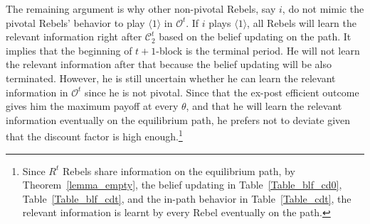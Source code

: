 \documentclass[12pt,letter]{article}
\newcommand{\Kappa}{\mathcal{C}}
\newcommand{\Omicron}{\mathcal{O}}
\theoremstyle{definition}
\theoremstyle{remark}
\theoremstyle{claim}
\begin{document}
The remaining argument is why other non-pivotal Rebels, say $i$, do not mimic the pivotal Rebels' behavior to play $\langle 1 \rangle$ in $\Omicron^t$. If $i$ plays $\langle 1 \rangle$, all Rebels will learn the relevant information right after $\Kappa^t_2$ based on the belief updating on the path. It implies that the beginning of $t+1$-block is the terminal period. He will not learn the relevant information after that because the belief updating will be also terminated. However, he is still uncertain whether he can learn the relevant information in $\Omicron^t$ since he is not pivotal. Since that the ex-post efficient outcome gives him the maximum payoff at every $\theta$, and that he will learn the relevant information eventually on the equilibrium path, he prefers not to deviate given that the discount factor is high enough.\footnote{Since $R^t$ Rebels share information on the equilibrium path, by Theorem~\ref{lemma_empty}, the belief updating in Table~\ref{Table_blf_cd0}, Table~\ref{Table_blf_cdt}, and the in-path behavior in Table~\ref{Table_cdt}, the relevant information is learnt by every Rebel eventually on the path.} 





\end{document}
